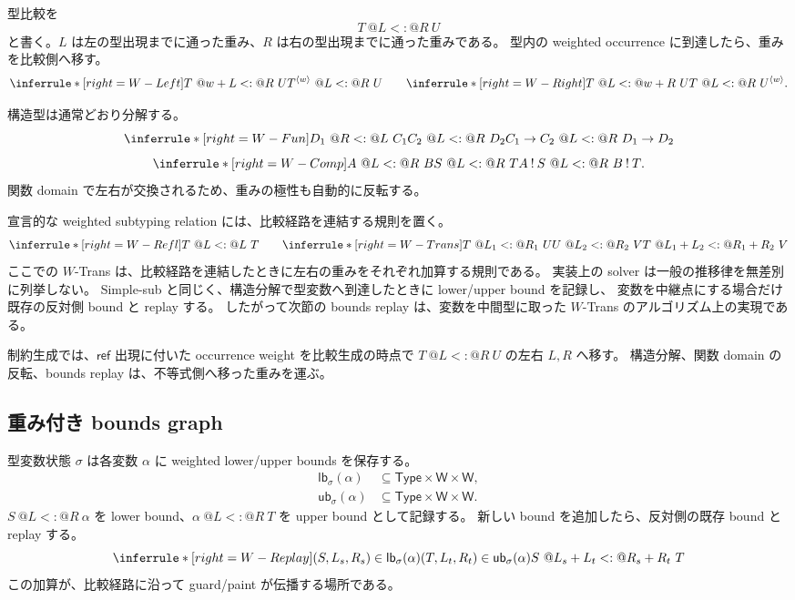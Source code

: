 \documentclass[uplatex,dvipdfmx,a4paper,11pt]{jsarticle}
\makeatletter
\theoremstyle{jpplain}
\newcommand{\eff}{\mathbin{!}}
\newcommand{\weight}{\mathsf W}
\newcommand{\wocc}[2]{#1^{\langle #2\rangle}}
\newcommand{\wsub}[4]{#1\ @#2\mathrel{<:}@#3\ #4}
\newcommand{\lb}{\mathsf{lb}}
\newcommand{\ub}{\mathsf{ub}}
\makeatother
\begin{document}
型比較を
\[
  \wsub{T}{L}{R}{U}
\]
と書く。$L$ は左の型出現までに通った重み、$R$ は右の型出現までに通った重みである。
型内の weighted occurrence に到達したら、重みを比較側へ移す。
\[
\inferrule*[right=W-Left]
 {\wsub{T}{w+L}{R}{U}}
 {\wsub{\wocc T w}{L}{R}{U}}
\qquad
\inferrule*[right=W-Right]
 {\wsub{T}{L}{w+R}{U}}
 {\wsub{T}{L}{R}{\wocc U w}}.
\]

構造型は通常どおり分解する。
\[
\inferrule*[right=W-Fun]
 {\wsub{D_1}{R}{L}{C_1}\\
  \wsub{C_2}{L}{R}{D_2}}
 {\wsub{C_1\to C_2}{L}{R}{D_1\to D_2}}
\]
\[
\inferrule*[right=W-Comp]
 {\wsub{A}{L}{R}{B}\\
  \wsub{S}{L}{R}{T}}
 {\wsub{A\eff S}{L}{R}{B\eff T}}.
\]
関数 domain で左右が交換されるため、重みの極性も自動的に反転する。

宣言的な weighted subtyping relation には、比較経路を連結する規則を置く。
\[
\inferrule*[right=W-Refl]
 {}
 {\wsub{T}{L}{L}{T}}
\qquad
\inferrule*[right=W-Trans]
 {\wsub{T}{L_1}{R_1}{U}\\
  \wsub{U}{L_2}{R_2}{V}}
 {\wsub{T}{L_1+L_2}{R_1+R_2}{V}}
\]
ここでの \(W\)-Trans は、比較経路を連結したときに左右の重みをそれぞれ加算する規則である。
実装上の solver は一般の推移律を無差別に列挙しない。
Simple-sub と同じく、構造分解で型変数へ到達したときに lower/upper bound を記録し、
変数を中継点にする場合だけ既存の反対側 bound と replay する。
したがって次節の bounds replay は、変数を中間型に取った \(W\)-Trans のアルゴリズム上の実現である。

\begin{formalbox}[title={項の重みは不等式側へ移る},fonttitle=\bfseries]
制約生成では、\(\mathsf{ref}\) 出現に付いた occurrence weight を比較生成の時点で
\(\wsub{T}{L}{R}{U}\) の左右 \(L,R\) へ移す。
構造分解、関数 domain の反転、bounds replay は、不等式側へ移った重みを運ぶ。
\end{formalbox}

\subsection{重み付き bounds graph}

型変数状態 $\sigma$ は各変数 $\alpha$ に weighted lower/upper bounds を保存する。
\[
\begin{aligned}
 \lb_\sigma(\alpha)&\subseteq \mathsf{Type}\times\weight\times\weight,\\
 \ub_\sigma(\alpha)&\subseteq \mathsf{Type}\times\weight\times\weight.
\end{aligned}
\]
$\wsub{S}{L}{R}{\alpha}$ を lower bound、$\wsub{\alpha}{L}{R}{T}$ を upper bound として記録する。
新しい bound を追加したら、反対側の既存 bound と replay する。
\[
\inferrule*[right=W-Replay]
 {(S,L_s,R_s)\in\lb_\sigma(\alpha)\\
  (T,L_t,R_t)\in\ub_\sigma(\alpha)}
 {\wsub{S}{L_s+L_t}{R_s+R_t}{T}}
\]
この加算が、比較経路に沿って guard/paint が伝播する場所である。
\end{document}
